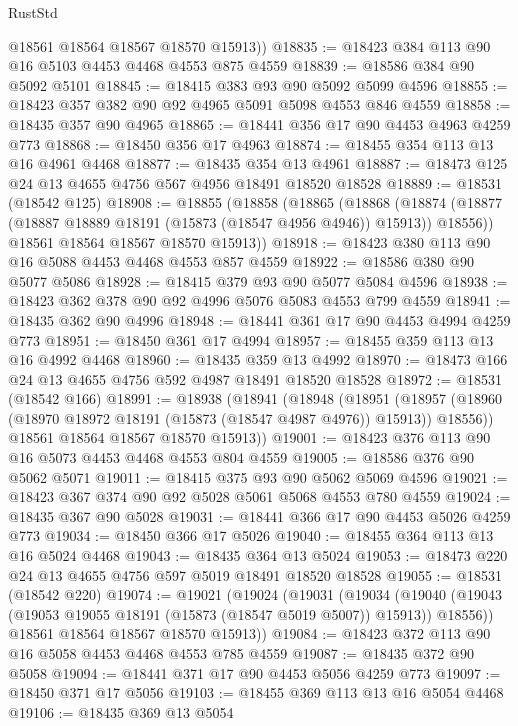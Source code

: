 \begin{lexlean}{RustStd}
\begin{coremodule}
        @18561
        @18564
        @18567
        @18570
        @15913))
@18835 := @18423 @384 @113 @90 @16 @5103 @4453 @4468 @4553 @875 @4559
@18839 := @18586 @384 @90 @5092 @5101
@18845 := @18415 @383 @93 @90 @5092 @5099 @4596
@18855 := @18423 @357 @382 @90 @92 @4965 @5091 @5098 @4553 @846 @4559
@18858 := @18435 @357 @90 @4965
@18865 := @18441 @356 @17 @90 @4453 @4963 @4259 @773
@18868 := @18450 @356 @17 @4963
@18874 := @18455 @354 @113 @13 @16 @4961 @4468
@18877 := @18435 @354 @13 @4961
@18887 := @18473 @125 @24 @13 @4655 @4756 @567 @4956 @18491 @18520 @18528
@18889 := @18531 (@18542 @125)
@18908 := @18855
    (@18858
      (@18865
        (@18868
          (@18874 (@18877 (@18887 @18889 @18191 (@15873 (@18547 @4956 @4946)) @15913)) @18556))
        @18561
        @18564
        @18567
        @18570
        @15913))
@18918 := @18423 @380 @113 @90 @16 @5088 @4453 @4468 @4553 @857 @4559
@18922 := @18586 @380 @90 @5077 @5086
@18928 := @18415 @379 @93 @90 @5077 @5084 @4596
@18938 := @18423 @362 @378 @90 @92 @4996 @5076 @5083 @4553 @799 @4559
@18941 := @18435 @362 @90 @4996
@18948 := @18441 @361 @17 @90 @4453 @4994 @4259 @773
@18951 := @18450 @361 @17 @4994
@18957 := @18455 @359 @113 @13 @16 @4992 @4468
@18960 := @18435 @359 @13 @4992
@18970 := @18473 @166 @24 @13 @4655 @4756 @592 @4987 @18491 @18520 @18528
@18972 := @18531 (@18542 @166)
@18991 := @18938
    (@18941
      (@18948
        (@18951
          (@18957 (@18960 (@18970 @18972 @18191 (@15873 (@18547 @4987 @4976)) @15913)) @18556))
        @18561
        @18564
        @18567
        @18570
        @15913))
@19001 := @18423 @376 @113 @90 @16 @5073 @4453 @4468 @4553 @804 @4559
@19005 := @18586 @376 @90 @5062 @5071
@19011 := @18415 @375 @93 @90 @5062 @5069 @4596
@19021 := @18423 @367 @374 @90 @92 @5028 @5061 @5068 @4553 @780 @4559
@19024 := @18435 @367 @90 @5028
@19031 := @18441 @366 @17 @90 @4453 @5026 @4259 @773
@19034 := @18450 @366 @17 @5026
@19040 := @18455 @364 @113 @13 @16 @5024 @4468
@19043 := @18435 @364 @13 @5024
@19053 := @18473 @220 @24 @13 @4655 @4756 @597 @5019 @18491 @18520 @18528
@19055 := @18531 (@18542 @220)
@19074 := @19021
    (@19024
      (@19031
        (@19034
          (@19040 (@19043 (@19053 @19055 @18191 (@15873 (@18547 @5019 @5007)) @15913)) @18556))
        @18561
        @18564
        @18567
        @18570
        @15913))
@19084 := @18423 @372 @113 @90 @16 @5058 @4453 @4468 @4553 @785 @4559
@19087 := @18435 @372 @90 @5058
@19094 := @18441 @371 @17 @90 @4453 @5056 @4259 @773
@19097 := @18450 @371 @17 @5056
@19103 := @18455 @369 @113 @13 @16 @5054 @4468
@19106 := @18435 @369 @13 @5054

\end{coremodule}
\end{lexlean}
